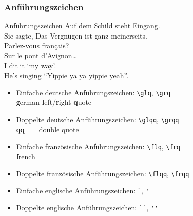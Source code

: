 \begin{frame}[c,fragile]
\frametitle{Anf\"uhrungszeichen}

\begin{block}{Anf\"uhrungszeichen}
Auf dem Schild steht \glq Eingang\grq. \\
Sie sagte, \glqq Das Vergn\"ugen ist ganz meinerseits.\grqq \\
\flq Parlez-vous fran\c{c}ais?\frq \\
\flqq Sur le pont d'Avignon\ldots\frqq \\
I dit it `my way'. \\
He's singing ``Yippie ya ya yippie yeah''.
\end{block}

\begin{itemize}
\item Einfache deutsche Anf\"uhrungszeichen: \verb|\glq|, \verb|\grq| \\
  \textbf{g}erman \textbf{l}eft/\textbf{r}ight \textbf{q}uote
\item Doppelte deutsche Anf\"uhrungszeichen: \verb|\glqq|, \verb|\grqq| \\
  \textbf{qq} $=$ double quote
\item Einfache franz\"osische Anf\"uhrungszeichen: \verb|\flq|, \verb|\frq| \\
  \textbf{f}rench
\item Doppelte franz\"osische Anf\"uhrungszeichen: \verb|\flqq|, \verb|\frqq|
\item Einfache englische Anf\"uhrungszeichen: \verb|`|, \verb|'|
\item Doppelte englische Anf\"uhrungszeichen: \verb|``|, \verb|''|
\end{itemize}
\end{frame}

